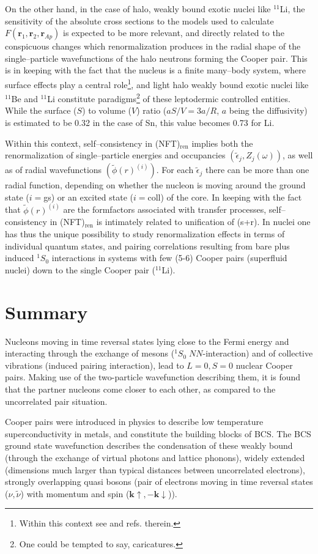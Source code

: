 On the other hand, in the case of halo, weakly bound exotic nuclei like $^{11}$Li, the sensitivity of the absolute cross sections to the models used to calculate $F(\mathbf r_1,\mathbf r_2,\mathbf r_{Ap})$ is expected to be more relevant, and directly related to the conspicuous changes which renormalization produces in the radial shape of the single--particle wavefunctions of the halo neutrons forming the Cooper pair. This is in keeping with  the fact that the nucleus is a finite many--body system, where surface effects play a central role\footnote{Within this context see \cite{Broglia:02d} and refs. therein.}, and light halo weakly bound exotic nuclei like $^{11}$Be and $^{11}$Li constitute paradigms\footnote{One could be tempted to say, caricatures.} of these leptodermic controlled entities.  While the surface ($S$) to volume ($V$) ratio ($aS/V=3a/R$, $a$ being the diffusivity) is estimated to be 0.32 in the case of Sn, this value becomes 0.73 for Li.

Within this context, self--consistency in (NFT)$_{\text{ren}}$ implies both the renormalization of single--particle energies and occupancies $(\tilde\epsilon_j,Z_j(\omega))$, as well as of radial wavefunctions $(\tilde\phi(r)^{(i)})$. For each $\tilde\epsilon_j$ there can be more than one radial function, depending on whether the nucleon is moving around the ground state ($i=$gs) or an excited state ($i=$coll) of the core. In keeping with the fact that $\tilde{\phi}(r)^{(i)}$ are the formfactors associated with transfer processes, self--consistency in (NFT)$_{\text{ren}}$ is intimately related to unification of (s+r). In nuclei one has thus the unique possibility to study renormalization effects in terms of individual quantum states, and pairing correlations resulting from bare plus induced $^1S_0$ interactions in systems with few (5-6) Cooper pairs (superfluid nuclei) down to the single Cooper pair ($^{11}$Li).
 \section{Summary}
Nucleons moving in time reversal states lying close to the Fermi energy and interacting through the exchange of mesons ($^1S_0\;NN$-interaction) and of collective vibrations (induced pairing interaction), lead to $L=0, S=0$ nuclear Cooper pairs. Making use of the two-particle wavefunction describing them, it is found that the partner nucleons come closer to each other, as compared to the uncorrelated pair situation.

Cooper pairs were introduced in physics to describe low temperature superconductivity in metals, and constitute the building blocks of BCS. The BCS ground state wavefunction describes the condensation of these weakly bound (through the exchange of virtual photons and lattice phonons), widely extended (dimensions much larger than typical distances between uncorrelated electrons), strongly overlapping quasi bosons (pair of electrons moving in time reversal states ($\nu,\tilde \nu$) with momentum and spin ($\mathbf k\uparrow,-\mathbf k\downarrow$)).

